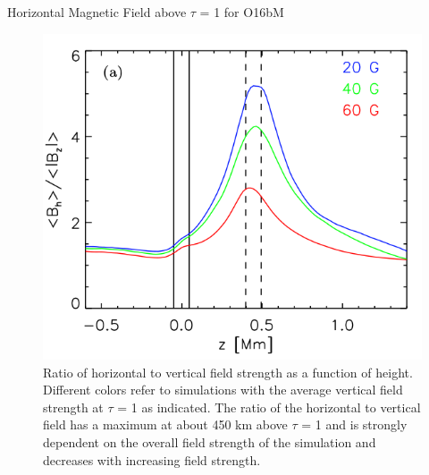 \documentclass{beamer}
\begin{document}
\begin{frame}{Horizontal Magnetic Field above $\tau$ = 1 for O16bM }

\begin{figure}[H]
 \centering
 \includegraphics[scale=0.3]{img381.png}
	\caption{Ratio of horizontal to vertical field strength as a function of height. Different colors refer to simulations with the average vertical field strength at $\tau$ = 1
as indicated. The ratio of the horizontal to vertical field has a maximum at about 450 km above $\tau$ = 1 and is strongly dependent on the overall field strength of the
simulation and decreases with increasing field strength. }
\end{figure}

\end{frame}
\end{document}
